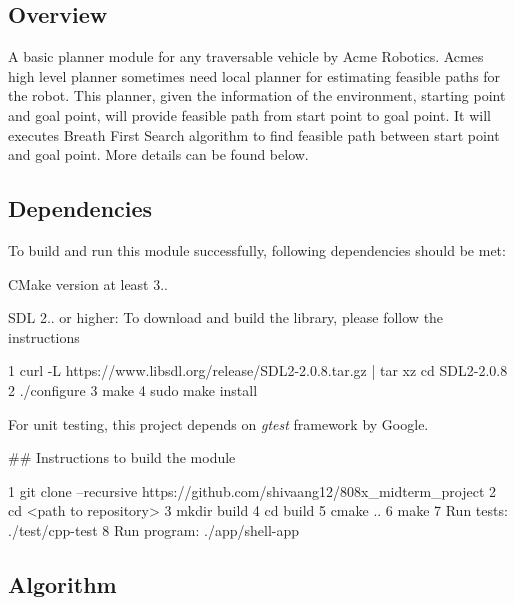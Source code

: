 \href{https://travis-ci.org/shivaang12/808x_midterm_project}{\tt } \href{https://coveralls.io/github/shivaang12/808x_midterm_project?branch=master}{\tt } \href{https://opensource.org/licenses/MIT}{\tt }

\subsection*{Overview}

A basic planner module for any traversable vehicle by Acme Robotics. Acme\textquotesingle{}s high level planner sometimes need local planner for estimating feasible paths for the robot. This planner, given the information of the environment, starting point and goal point, will provide feasible path from start point to goal point. It will executes Breath First Search algorithm to find feasible path between start point and goal point. More details can be found below.

\subsection*{Dependencies}

To build and run this module successfully, following dependencies should be met\+:
\begin{DoxyItemize}
\item C\+Make version at least 3..
\item S\+DL 2.. or higher\+: To download and build the library, please follow the instructions 
\begin{DoxyCode}
1 curl -L https://www.libsdl.org/release/SDL2-2.0.8.tar.gz | tar xz cd SDL2-2.0.8
2 ./configure
3 make
4 sudo make install
\end{DoxyCode}

\item For unit testing, this project depends on {\itshape gtest} framework by Google.
\end{DoxyItemize}

\#\# Instructions to build the module 
\begin{DoxyCode}
1 git clone --recursive https://github.com/shivaang12/808x\_midterm\_project
2 cd <path to repository>
3 mkdir build
4 cd build
5 cmake ..
6 make
7 Run tests: ./test/cpp-test
8 Run program: ./app/shell-app
\end{DoxyCode}


\subsection*{Algorithm}

